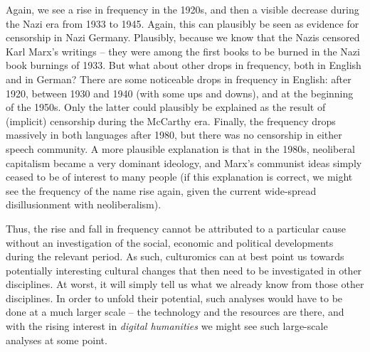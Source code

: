 Again, we see a rise in frequency  in the 1920s, and then a visible decrease during the Nazi era from 1933 to 1945. Again, this can plausibly be seen as evidence for censorship in Nazi Germany. Plausibly, because we know that the Nazis censored Karl Marx's writings -- they were among the first books to be burned in the Nazi book burnings of 1933. But what about other drops in frequency, both in English and in German? There are some noticeable drops in frequency in English: after 1920, between 1930 and 1940 (with some ups and downs), and at the beginning of the 1950s. Only the latter could plausibly be explained as the result of (implicit) censorship during the McCarthy era. Finally, the frequency  drops massively in both languages after 1980, but there was no censorship in either speech community. A more plausible explanation  is that in the 1980s, neoliberal capitalism became a very dominant ideology,  and Marx's communist ideas simply ceased to be of interest to many people (if this explanation is correct, we might see the frequency of the name rise again, given the current wide\hyp{}spread disillusionment with neoliberalism).

Thus, the rise and fall in frequency  cannot be attributed to a particular cause without an investigation of the social, economic and political developments during the relevant period. As such, culturomics  can at best point us towards potentially interesting cultural changes that then need to be investigated in other disciplines. At worst, it will simply tell us what we already know from those other disciplines. In order to unfold their potential, such analyses would have to be done at a much larger scale -- the technology and the resources are there, and with the rising interest in \textit{digital humanities}  we might see such large\hyp{}scale analyses at some point.
